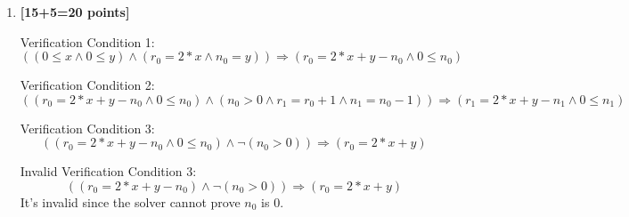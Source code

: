 \documentclass{article}
\begin{document}
\begin{enumerate}
\item \textbf{[15+5=20 points]}

Verification Condition 1:
\[
((0 \leq x \land 0 \leq y) \land (r_0 = 2*x \land n_0 = y)) \Rightarrow (r_0 = 2*x+y-n_0 \land 0 \leq n_0)
\]

Verification Condition 2:
\[
((r_0 = 2*x+y-n_0 \land 0 \leq n_0) \land (n_0 > 0 \land r_1 = r_0 + 1 \land n_1 = n_0 - 1)) \Rightarrow (r_1 = 2*x+y-n_1 \land 0 \leq n_1)
\]

Verification Condition 3:
\[
((r_0 = 2*x+y-n_0 \land 0 \leq n_0) \land \neg(n_0 > 0)) \Rightarrow (r_0 = 2*x+y)
\]

Invalid Verification Condition 3:
\[
((r_0 = 2*x+y-n_0) \land \neg(n_0 > 0)) \Rightarrow (r_0 = 2*x+y)
\]
It's invalid since the solver cannot prove \(n_0\) is 0.



\end{enumerate}
\end{document}

